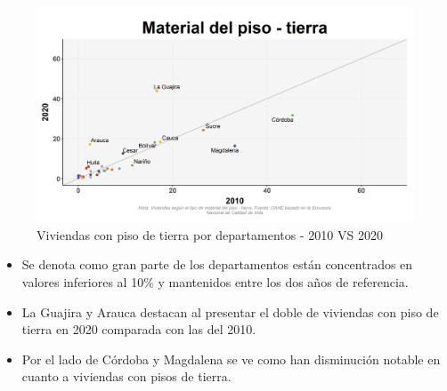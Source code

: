     \begin{figure}[H]
        \caption{Viviendas con piso de tierra por departamentos - 2010 VS 2020 \label{map_result_2} }
        \begin{center}
        \includegraphics[width=\textwidth,keepaspectratio]{img/var_179_scatter_time.png}
        \end{center}
    \end{figure}
            \begin{itemize}
                    \item Se denota como gran parte de los departamentos están concentrados en valores inferiores al 10\% y mantenidos entre los dos años de referencia. 
                    \item La Guajira y Arauca destacan al presentar el doble de viviendas con piso de tierra en 2020 comparada con las del 2010.
                    \item Por el lado de Córdoba y Magdalena se ve como han disminución notable en cuanto a viviendas con pisos de tierra.
                    \end{itemize}

